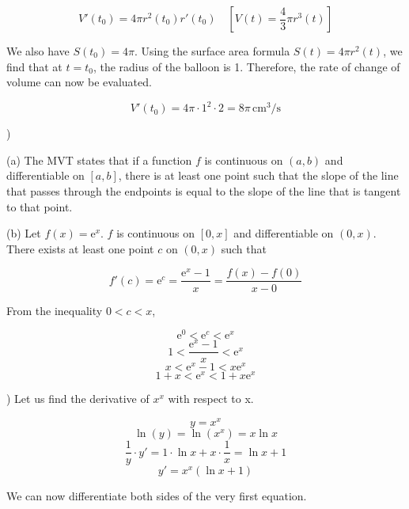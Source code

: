 \documentclass{article}
\begin{document}
\[V'(t_0) = 4\pi r^2(t_0)r'(t_0) \quad\left[V(t) = \frac43 \pi r^3(t)\right] \]

\hfill

\noindent We also have $S(t_0) = 4\pi$. Using the surface area formula $S(t) = 4\pi r^2(t)$, we find that at $t=t_0$, the radius of the balloon is 1. Therefore, the rate of change of volume can now be evaluated.

\[V'(t_0)=4\pi\cdot1^2\cdot2=\boxed{8\pi\,\text{cm}^3\text{/s}}\]

\hfill

)

\hfill

\noindent (a) The MVT states that if a function $f$ is continuous on $(a,b)$ and differentiable on $[a,b]$, there is at least one point such that the slope of the line that passes through the endpoints is equal to the slope of the line that is tangent to that point.

\hfill

\noindent (b) Let $f(x)=\mathrm{e}^x$. $f$ is continuous on $[0,x]$ and differentiable on $(0,x)$.  There exists at least one point $c$ on $(0,x)$ such that

\begin{equation*}
f'(c) = \mathrm{e}^c=\frac{\mathrm{e}^x-1}x=\frac{f(x)-f(0)}{x-0}
\end{equation*}

\hfill

\noindent From the inequality $0<c<x$,

\begin{equation*}\mathrm{e}^0<\mathrm{e}^c<\mathrm{e}^x\end{equation*}
\begin{equation*}1<\frac{\mathrm{e}^x-1}x<\mathrm{e}^x\end{equation*}
\begin{equation*}x<\mathrm{e}^x-1 <x\mathrm{e}^x\end{equation*}
\begin{equation*}1+x<\mathrm{e}^x <1+x\mathrm{e}^x\end{equation*}

\hfill

) Let us find the derivative of $x^x$ with respect to x.

\[y=x^x\]
\[\ln(y)=\ln(x^x) = x\ln x\]
\[\frac1y\cdot y'=1\cdot\ln x + x\cdot \frac1x = \ln x +1\]
\[y'=x^x(\ln x+1)\]

\hfill

\noindent We can now differentiate both sides of the very first equation.
\end{document}
